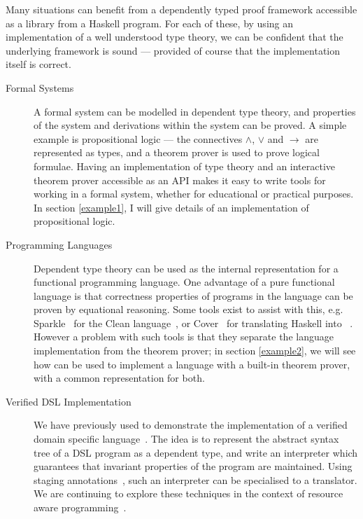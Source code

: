 Many situations can benefit from a dependently typed proof framework
accessible as a library from a Haskell program.  For
each of these, by using an implementation of a well understood type
theory, we can be confident that the underlying framework is sound ---
provided of course that the implementation itself is correct. 

\begin{description}
\item[Formal Systems] 

A formal system can be modelled in dependent type theory, and
properties of the system and derivations within the system can be
proved. A simple example is propositional logic --- the connectives
$\land$, $\lor$ and $\to$ are represented as types, and a theorem
prover is used to prove logical formulae.  Having an implementation of
type theory and an interactive theorem prover accessible as an API
makes it easy to write tools for working in a formal system, whether
for educational or practical purposes.  In section \ref{example1}, I
will give details of an implementation of propositional logic.

\item[Programming Languages] 
Dependent type theory can be used as the internal representation for a
functional programming language. 
One advantage of a pure functional language is that correctness
properties of programs in the language can be proven by equational
reasoning.  Some tools exist to assist with this,
e.g. Sparkle~\cite{sparkle} for the Clean language~\cite{clean}, or
Cover~\cite{cover} for translating Haskell into
\Agda{}~\cite{agda}. However a problem with such tools is that they
separate the language implementation from the theorem prover; in section
\ref{example2}, we will see how \Ivor{} can be used to implement a
language with a built-in theorem prover, with a common representation
for both.

\item[Verified DSL Implementation]
We have previously used \Ivor{} to demonstrate the implementation of
a verified domain specific language~\cite{dtpmsp-gpce}. The idea is to
represent the abstract syntax tree of a DSL program as a dependent
type, and write an interpreter which guarantees that invariant
properties of the program are maintained. Using staging
annotations~\cite{multi-taha}, such an interpreter can be specialised
to a translator. We are continuing to explore these techniques in the
context of resource aware programming~\cite{dt-framework}.

\end{description}

